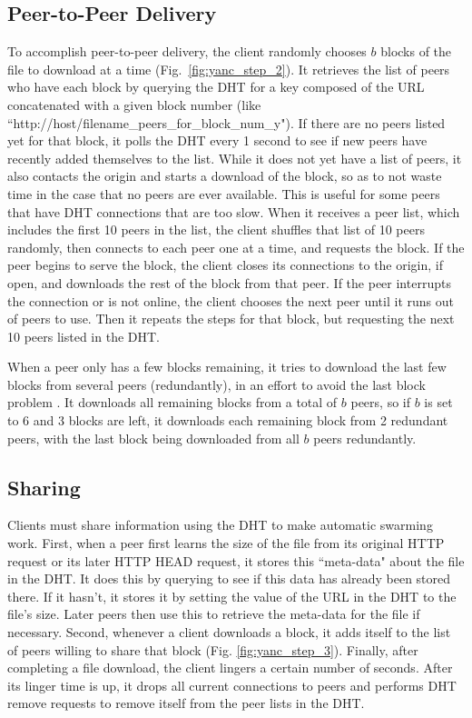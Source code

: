 \subsection{Peer-to-Peer Delivery}

To accomplish peer-to-peer delivery, the client randomly chooses $b$ blocks of the file to download at a time (Fig.~\ref{fig:yanc_step_2}).  
It retrieves the list of peers who have each block by querying the DHT for a key composed of
the URL concatenated with a given block number (like ``http://host/filename\_peers\_for\_block\_num\_y").  
If there are no peers listed yet for that block, it polls the DHT every 1 second to see if new peers have recently added themselves to the list.
While it does not yet have a list of peers, it also contacts the origin and starts a download of the block, so as to 
not waste time in the case that no peers are ever available.  This is useful for some peers that have DHT connections that are too slow.
When it receives a peer list, which includes the first 10 peers in the list, the client shuffles that list of 10 peers randomly, then connects to each peer one at a time, and requests the block.  
If the peer begins to serve the block, the client closes its connections to the origin, if open, and downloads the rest of the block from that peer.  
If the peer interrupts the connection or is not online, the client chooses the next peer until it runs out of peers to use.  
Then it repeats the steps for that block, but requesting the next 10 peers listed in the DHT.

When a peer only has a few blocks remaining, it tries to download the last few blocks from several peers (redundantly), in an effort to avoid the last block problem \cite{last_block}.  
It downloads all remaining blocks from a total of $b$ peers, so if $b$ is set to 6 and 3 blocks are left, it downloads each remaining block from 2 redundant peers, with the
last block being downloaded from all $b$ peers redundantly.

\subsection{Sharing}

Clients must share information using the DHT to make automatic swarming work.  First, when a peer first learns the size of the file 
from its original HTTP request or its later HTTP HEAD request, it stores this ``meta-data" about the file
in the DHT.  It does this by querying to see if this data has already been stored there.  If it hasn't, it stores it by setting the value of the URL in the DHT to the file's size. 
Later peers then use this to retrieve the meta-data for the file if necessary.
Second, whenever a client downloads a block, it adds itself to the list of peers willing to share that block (Fig. \ref{fig:yanc_step_3}). 
Finally, after completing a file download, the client lingers a certain number of seconds.  After its linger time is up, it drops all current connections to peers 
and performs DHT remove requests to remove itself from the peer lists in the DHT.

